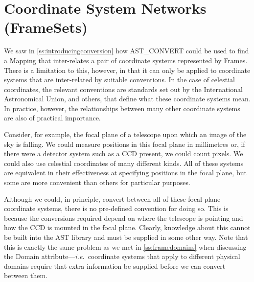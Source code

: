 \documentclass[twoside,11pt]{article}
\newcommand{\htmlref}[2]{#1}
\newcommand{\secref}[1]{\S\ref{#1}}
\renewcommand{\secref}[1]{\ref{#1}}
\begin{document}
%
%

\cleardoublepage
\section{\label{ss:framesets}Coordinate System Networks (FrameSets)}

We saw in \secref{ss:introducingconversion} how \htmlref{AST\_CONVERT}{AST_CONVERT} could be
used to find a \htmlref{Mapping}{Mapping} that inter-relates a pair of coordinate systems
represented by Frames. There is a limitation to this, however, in that
it can only be applied to coordinate systems that are inter-related by
suitable conventions. In the case of celestial coordinates, the
relevant conventions are standards set out by the International
Astronomical Union, and others, that define what these coordinate
systems mean. In practice, however, the relationships between many
other coordinate systems are also of practical importance.

Consider, for example, the focal plane of a telescope upon which an
image of the sky is falling. We could measure positions in this focal
plane in millimetres or, if there were a detector system such as a CCD
present, we could count pixels. We could also use celestial
coordinates of many different kinds. All of these systems are
equivalent in their effectiveness at specifying positions in the focal
plane, but some are more convenient than others for particular
purposes.

Although we could, in principle, convert between all of these focal
plane coordinate systems, there is no pre-defined convention for doing
so. This is because the conversions required depend on where the
telescope is pointing and how the CCD is mounted in the focal
plane. Clearly, knowledge about this cannot be built into the AST
library and must be supplied in some other way. Note that this is
exactly the same problem as we met in \secref{ss:framedomains} when
discussing the \htmlref{Domain}{Domain} attribute---{\em{i.e.}}\ coordinate systems that
apply to different physical domains require that extra information be
supplied before we can convert between them.
\end{document}
